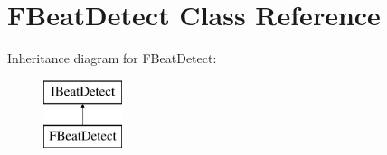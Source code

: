 \hypertarget{class_f_beat_detect}{}\section{F\+Beat\+Detect Class Reference}
\label{class_f_beat_detect}
Inheritance diagram for F\+Beat\+Detect\+:\begin{figure}[H]
\begin{center}
\leavevmode
\includegraphics[height=2.000000cm]{class_f_beat_detect}
\end{center}
\end{figure}
